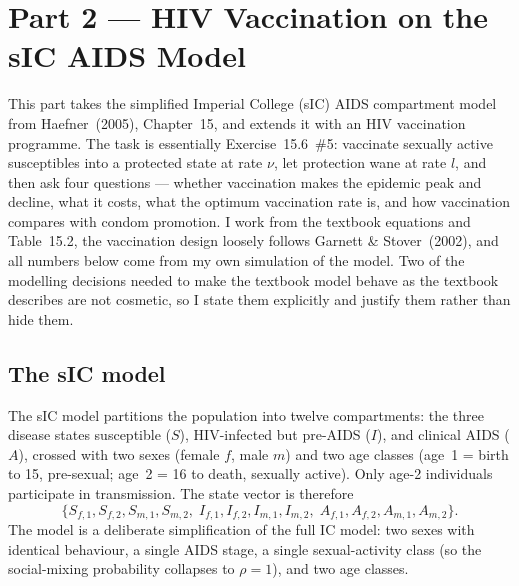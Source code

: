 \section{Part 2 --- HIV Vaccination on the sIC AIDS Model}

This part takes the simplified Imperial College (sIC) AIDS compartment model from
Haefner~(2005), Chapter~15, and extends it with an HIV vaccination programme. The
task is essentially Exercise~15.6~\#5: vaccinate sexually active susceptibles into
a protected state at rate $\nu$, let protection wane at rate $l$, and then ask four
questions --- whether vaccination makes the epidemic peak and decline, what it
costs, what the optimum vaccination rate is, and how vaccination compares with
condom promotion. I work from the textbook equations and Table~15.2, the
vaccination design loosely follows Garnett \& Stover~(2002), and all numbers below
come from my own simulation of the model. Two of the modelling decisions needed to
make the textbook model behave as the textbook describes are not cosmetic, so I
state them explicitly and justify them rather than hide them.

\subsection{The sIC model}

The sIC model partitions the population into twelve compartments: the three disease
states susceptible ($S$), HIV-infected but pre-AIDS ($I$), and clinical AIDS ($A$),
crossed with two sexes (female $f$, male $m$) and two age classes (age~1 = birth to
15, pre-sexual; age~2 = 16 to death, sexually active). Only age-2 individuals
participate in transmission. The state vector is therefore
\[
\{S_{f,1},S_{f,2},S_{m,1},S_{m,2},\;
  I_{f,1},I_{f,2},I_{m,1},I_{m,2},\;
  A_{f,1},A_{f,2},A_{m,1},A_{m,2}\}.
\]
The model is a deliberate simplification of the full IC model: two sexes with
identical behaviour, a single AIDS stage, a single sexual-activity class (so the
social-mixing probability collapses to $\rho=1$), and two age classes.

